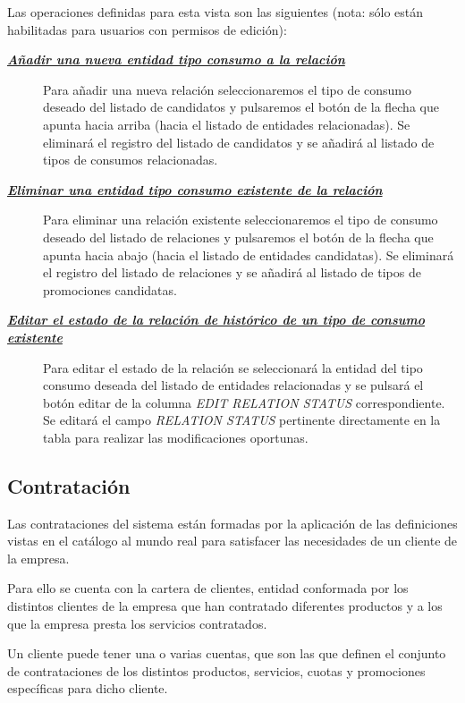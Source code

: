 Las operaciones definidas para esta vista son las siguientes (nota: sólo están habilitadas para usuarios con permisos de edición):
\begin{description}
\item[\underline{\textsl{\textbf{Añadir una nueva entidad tipo consumo a la relación}}}] Para añadir una nueva relación seleccionaremos el tipo de consumo deseado del listado de candidatos y pulsaremos el botón de la flecha que apunta hacia arriba (hacia el listado de entidades relacionadas). Se eliminará el registro del listado de candidatos y se añadirá al listado de tipos de consumos relacionadas.

\item[\underline{\textsl{\textbf{Eliminar una entidad tipo consumo existente de la relación}}}] Para eliminar una relación existente seleccionaremos el tipo de consumo deseado del listado de relaciones y pulsaremos el botón de la flecha que apunta hacia abajo (hacia el listado de entidades candidatas). Se eliminará el registro del listado de relaciones y se añadirá al listado de tipos de promociones candidatas.

\item[\underline{\textsl{\textbf{Editar el estado de la relación de histórico de un tipo de consumo existente}}}] Para editar el estado de la relación se seleccionará la entidad del tipo consumo  deseada del listado de entidades relacionadas y se pulsará el botón editar de la columna \textit{EDIT RELATION STATUS} correspondiente. Se editará el campo \emph{RELATION STATUS} pertinente directamente en la tabla para realizar las modificaciones oportunas.
\end{description}



\subsection{Contratación}
\label{sub:contratacion}

Las contrataciones del sistema están formadas por la aplicación de las definiciones vistas en el catálogo al mundo real para satisfacer las necesidades de un cliente de la empresa.

Para ello se cuenta con la cartera de clientes, entidad conformada por los distintos clientes de la empresa que han contratado diferentes productos y a los que la empresa presta los servicios contratados.

Un cliente puede tener una o varias cuentas, que son las que definen el conjunto de contrataciones de los distintos productos, servicios, cuotas y promociones específicas para dicho cliente.

